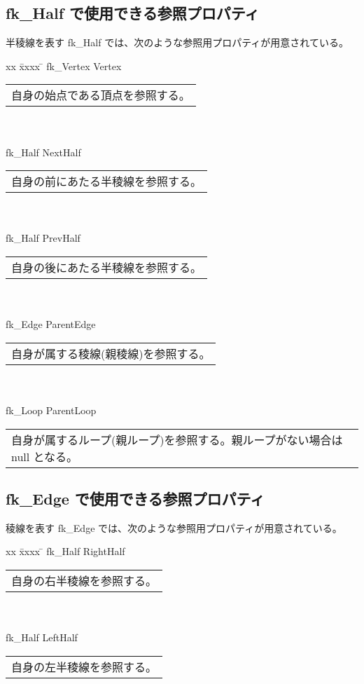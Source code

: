\subsection{fk\_Half で使用できる参照プロパティ}
半稜線を表す fk\_Half では、次のような参照用プロパティが用意されている。
\begin{tabbing}
xx \= xxxx \= \kill
\> fk\_Vertex Vertex \\
	\> \> \begin{tabular}{p{15cm}}
		自身の始点である頂点を参照する。
	\end{tabular} \\ \\

\> fk\_Half NextHalf \\
	\> \> \begin{tabular}{p{15cm}}
		自身の前にあたる半稜線を参照する。
	\end{tabular} \\ \\

\> fk\_Half PrevHalf \\
	\> \> \begin{tabular}{p{15cm}}
		自身の後にあたる半稜線を参照する。
	\end{tabular} \\ \\

\> fk\_Edge ParentEdge \\
	\> \> \begin{tabular}{p{15cm}}
		自身が属する稜線(親稜線)を参照する。
	\end{tabular} \\ \\

\> fk\_Loop ParentLoop \\
	\> \> \begin{tabular}{p{15cm}}
		自身が属するループ(親ループ)を参照する。親ループがない場合は null となる。
	\end{tabular}
\end{tabbing}

\subsection{fk\_Edge で使用できる参照プロパティ}
稜線を表す fk\_Edge では、次のような参照用プロパティが用意されている。
\begin{tabbing}
xx \= xxxx \= \kill
\> fk\_Half RightHalf \\
	\> \> \begin{tabular}{p{15cm}}
		自身の右半稜線を参照する。
	\end{tabular} \\ \\

\> fk\_Half LeftHalf \\
	\> \> \begin{tabular}{p{15cm}}
		自身の左半稜線を参照する。
	\end{tabular}
\end{tabbing}

